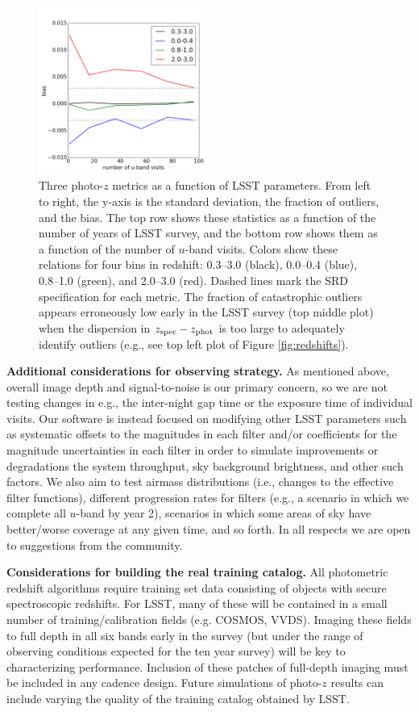 \begin{figure}[h]
\begin{center}
\includegraphics[width=5.5cm]{figs/photoz/uvisits_bias.png}
\caption{Three photo-$z$ metrics as a function of LSST parameters. From left to right, the y-axis is the standard deviation, the fraction of outliers, and the bias. The top row shows these statistics as a function of the number of years of LSST survey, and the bottom row shows them as a function of the number of $u$-band visits. Colors show these relations for four bins in redshift: 0.3--3.0 (black), 0.0--0.4 (blue), 0.8--1.0 (green), and 2.0--3.0 (red). Dashed lines mark the SRD specification for each metric. The fraction of catastrophic outliers appears erroneously low early in the LSST survey (top middle plot) when the dispersion in $z_{\rm spec}-z_{\rm phot}$ is too large to adequately identify outliers (e.g., see top left plot of Figure \ref{fig:redshifts}).   \label{fig:metrics}}
\end{center}
\end{figure}

\textbf{Additional considerations for observing strategy.} As mentioned above, overall image depth and signal-to-noise is our primary concern, so we are not testing changes in e.g., the inter-night gap time or the exposure time of individual visits.  Our software is instead focused on modifying other LSST parameters such as systematic offsets to the magnitudes in each filter and/or coefficients for the magnitude uncertainties in each filter in order to simulate improvements or degradations the system throughput, sky background brightness, and other such factors. We also aim to test airmass distributions (i.e., changes to the effective filter functions), different progression rates for filters (e.g., a scenario in which we complete all $u$-band by year 2), scenarios in which some areas of sky have better/worse coverage at any given time, and so forth. In all respects we are open to suggestions from the community.

\textbf{Considerations for building the real training catalog.} All photometric redshift algorithms require training set data consisting of objects with secure spectroscopic redshifts.  For LSST, many of these will be contained in a small number of training/calibration fields (e.g. COSMOS, VVDS).  Imaging these fields to full depth in all six bands early in the survey (but under the range of observing conditions expected for the ten year survey) will be key to characterizing performance.  Inclusion of these patches of full-depth imaging must be included in any cadence design. Future simulations of photo-$z$ results can include varying the quality of the training catalog obtained by LSST.


\navigationbar

